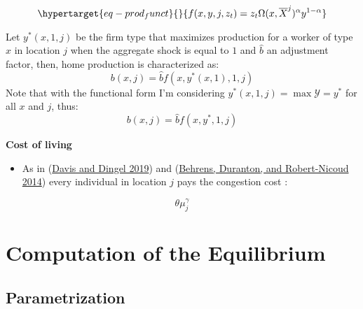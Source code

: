 \documentclass[
  letterpaper,
  DIV=11,
  numbers=noendperiod]{scrreprt}
\providecommand{\tightlist}{%
  \setlength{\itemsep}{0pt}\setlength{\parskip}{0pt}}\usepackage{longtable,booktabs,array}
\begin{document}
\begin{equation}\protect\hypertarget{eq-prod_funct}{}{
f(x,y,j,z_t) = z_t \Omega(x,\overline{X}^j)^\alpha y^{1-\alpha}
}\label{eq-prod_funct}\end{equation}

Let \(y^*(x,1, j)\) be the firm type that maximizes production for a
worker of type \(x\) in location \(j\) when the aggregate shock is equal
to \(1\) and \(\hat{b}\) an adjustment factor, then, home production is
characterized as:\\
\[
b(x, j) = \hat{b} f(x,y^*(x,1),1, j)\] Note that with the functional
form I'm considering \(y^{*}(x,1,j) = \max{\mathcal{Y}}=y^{*}\) for all
\(x\) and \(j\), thus: \[b(x, j) = \hat{b} f(x,y^*,1, j)\]

\textbf{Cost of living}

\begin{itemize}
\tightlist
\item
  As in (\protect\hyperlink{ref-davisSpatialKnowledgeEconomy2019}{Davis
  and Dingel 2019}) and
  (\protect\hyperlink{ref-behrensProductiveCitiesSorting2014a}{Behrens,
  Duranton, and Robert-Nicoud 2014}) every individual in location \(j\)
  pays the congestion cost :
\end{itemize}

\[\theta\mu_j^{\gamma}\]


\hypertarget{computation-of-the-equilibrium}{%
\chapter{Computation of the
Equilibrium}\label{computation-of-the-equilibrium}}

\hypertarget{parametrization}{%
\section{Parametrization}\label{parametrization}}
\end{document}
